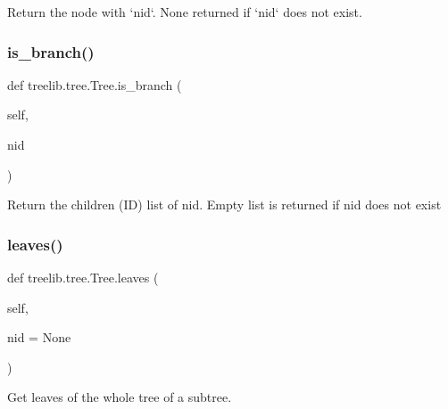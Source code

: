 \begin{DoxyVerb}Return the node with `nid`. None returned if `nid` does not exist.\end{DoxyVerb}
 \mbox{\label{classtreelib_1_1tree_1_1Tree_a15a76763504c43369635e2f262d1678b}} 
\subsubsection{\texorpdfstring{is\+\_\+branch()}{is\_branch()}}
{\footnotesize\ttfamily def treelib.\+tree.\+Tree.\+is\+\_\+branch (\begin{DoxyParamCaption}\item[{}]{self,  }\item[{}]{nid }\end{DoxyParamCaption})}

\begin{DoxyVerb}Return the children (ID) list of nid.
Empty list is returned if nid does not exist
\end{DoxyVerb}
 \mbox{\label{classtreelib_1_1tree_1_1Tree_a6bd72744ae2728143a611f3b32eeb763}} 
\subsubsection{\texorpdfstring{leaves()}{leaves()}}
{\footnotesize\ttfamily def treelib.\+tree.\+Tree.\+leaves (\begin{DoxyParamCaption}\item[{}]{self,  }\item[{}]{nid = {\ttfamily None} }\end{DoxyParamCaption})}

\begin{DoxyVerb}Get leaves of the whole tree of a subtree.\end{DoxyVerb}
 \mbox{\label{classtreelib_1_1tree_1_1Tree_a4c1fa1eb04b6c8b4613a34425207c07e}} 
